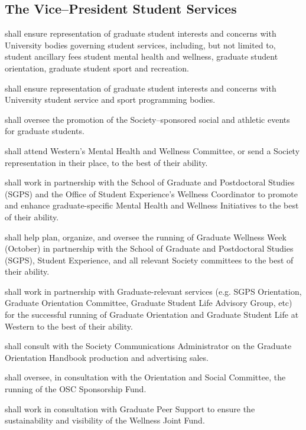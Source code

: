 \subsection {The Vice--President Student Services} 
\begin{longenum}[ label*=\thesubsection.\arabic*., align=left]
	\item shall ensure representation of graduate student interests and concerns with
	University bodies governing student services, including, but not limited to, student ancillary fees student mental health and wellness, graduate student orientation, graduate student sport and recreation.
    \item shall ensure representation of graduate student interests and concerns with University student service and sport programming bodies.
    \item shall oversee the promotion of the Society--sponsored social and athletic events for graduate students.
    \item shall attend Western's Mental Health and Wellness Committee, or send a Society
representation in their place, to the best of their ability.
\item shall work in partnership with the School of Graduate and Postdoctoral Studies (SGPS) and the Office of Student Experience's Wellness Coordinator to promote
and enhance graduate-specific Mental Health and Wellness Initiatives to the best of their
ability.
\item shall help plan, organize, and oversee the running of Graduate Wellness Week
(October) in partnership with the School of Graduate and Postdoctoral Studies (SGPS), Student Experience, and all relevant Society
committees to the best of their ability.
\item shall work in partnership with Graduate-relevant services (e.g. SGPS Orientation,
Graduate Orientation Committee, Graduate Student Life Advisory Group, etc) for the
successful running of Graduate Orientation and Graduate Student Life at Western to the
best of their ability.
\item shall consult with the Society Communications Administrator on the Graduate
Orientation Handbook production and advertising sales.
\item shall oversee, in consultation with the Orientation and Social Committee, the running of the OSC Sponsorship
Fund.
\item shall work in consultation with Graduate Peer Support to ensure the sustainability and visibility of
the Wellness Joint Fund.
    
\end{longenum}


